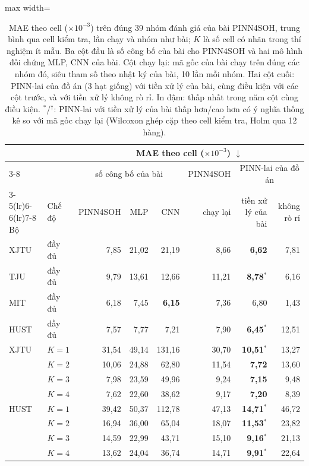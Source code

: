 \begin{table}[!htbp]\centering\small\setlength{\tabcolsep}{5pt}
\caption[So với PINN4SOH trên đúng cách chia của bài]{MAE theo cell ($\times10^{-3}$) trên đúng 39 nhóm đánh giá của bài PINN4SOH, trung bình qua cell kiểm tra, lần chạy và nhóm như bài; $K$ là số cell có nhãn trong thí nghiệm ít mẫu. Ba cột đầu là số công bố của bài cho PINN4SOH và hai mô hình đối chứng MLP, CNN của bài. Cột chạy lại: mã gốc của bài chạy trên đúng các nhóm đó, siêu tham số theo nhật ký của bài, 10 lần mỗi nhóm. Hai cột cuối: PINN-lai của đồ án (3 hạt giống) với tiền xử lý của bài, cùng điều kiện với các cột trước, và với tiền xử lý không rò rỉ. In đậm: thấp nhất trong năm cột cùng điều kiện. $^{*}$/$^{\dagger}$: PINN-lai với tiền xử lý của bài thấp hơn/cao hơn có ý nghĩa thống kê so với mã gốc chạy lại (Wilcoxon ghép cặp theo cell kiểm tra, Holm qua 12 hàng).}\label{tab:pub}
\begin{adjustbox}{max width=\textwidth}\begin{tabular}{llrrrrrr}\toprule
 & & \multicolumn{6}{c}{MAE theo cell ($\times10^{-3}$) $\downarrow$} \\\cmidrule(lr){3-8}
 & & \multicolumn{3}{c}{số công bố của bài} & PINN4SOH & \multicolumn{2}{c}{PINN-lai của đồ án} \\\cmidrule(lr){3-5}\cmidrule(lr){6-6}\cmidrule(lr){7-8}
Bộ & Chế độ & PINN4SOH & MLP & CNN & chạy lại & tiền xử lý của bài & không rò rỉ \\\midrule
XJTU & đầy đủ & 7{,}85 & 21{,}02 & 21{,}19 & 8{,}66 & \textbf{6{,}62} & 7{,}81 \\
TJU & đầy đủ & 9{,}79 & 13{,}61 & 12{,}66 & 11{,}21 & \textbf{8{,}78}$^{*}$ & 6{,}16 \\
MIT & đầy đủ & 6{,}18 & 7{,}45 & \textbf{6{,}15} & 7{,}36 & 6{,}80 & 1{,}43 \\
HUST & đầy đủ & 7{,}57 & 7{,}77 & 7{,}21 & 7{,}90 & \textbf{6{,}45}$^{*}$ & 12{,}51 \\
\addlinespace
XJTU & $K = 1$ & 31{,}54 & 49{,}14 & 131{,}16 & 30{,}70 & \textbf{10{,}51}$^{*}$ & 13{,}27 \\
 & $K = 2$ & 10{,}06 & 24{,}88 & 62{,}80 & 11{,}54 & \textbf{7{,}72} & 13{,}60 \\
 & $K = 3$ & 7{,}98 & 23{,}59 & 49{,}96 & 9{,}24 & \textbf{7{,}15} & 9{,}48 \\
 & $K = 4$ & 7{,}62 & 22{,}60 & 38{,}62 & 9{,}17 & \textbf{7{,}20} & 8{,}39 \\
\addlinespace
HUST & $K = 1$ & 39{,}42 & 50{,}37 & 112{,}78 & 47{,}13 & \textbf{14{,}71}$^{*}$ & 46{,}72 \\
 & $K = 2$ & 16{,}94 & 36{,}00 & 65{,}04 & 18{,}07 & \textbf{11{,}53}$^{*}$ & 23{,}82 \\
 & $K = 3$ & 14{,}59 & 22{,}99 & 43{,}71 & 15{,}10 & \textbf{9{,}16}$^{*}$ & 21{,}13 \\
 & $K = 4$ & 13{,}62 & 24{,}04 & 36{,}74 & 14{,}71 & \textbf{9{,}91}$^{*}$ & 22{,}64 \\
\bottomrule\end{tabular}\end{adjustbox}\end{table}

